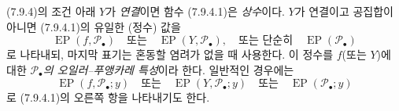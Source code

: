 \begin{env}[7.9.5]
\label{III.7.9.5.fr}
(7.9.4)의 조건 아래 $Y$가 \emph{연결}이면 함수 (7.9.4.1)은
\emph{상수}이다. $Y$가 연결이고 공집합이 아니면 (7.9.4.1)의 유일한
(정수) 값을
\[
  \operatorname{EP}(f,\mathscr P_\bullet)
  \quad\text{또는}\quad
  \operatorname{EP}(Y,\mathscr P_\bullet),
  \quad\text{또는 단순히}\quad
  \operatorname{EP}(\mathscr P_\bullet)
\]
로 나타내되, 마지막 표기는 혼동할 염려가 없을 때 사용한다. 이 정수를
$f$(또는 $Y$)에 대한 \emph{$\mathscr P_\bullet$의
오일러--푸앵카레 특성}이라 한다. 일반적인 경우에는
\[
  \operatorname{EP}(f,\mathscr P_\bullet;y)
  \quad\text{또는}\quad
  \operatorname{EP}(Y,\mathscr P_\bullet;y)
  \quad\text{또는}\quad
  \operatorname{EP}(\mathscr P_\bullet;y)
\]
로 (7.9.4.1)의 오른쪽 항을 나타내기도 한다.
\end{env}

